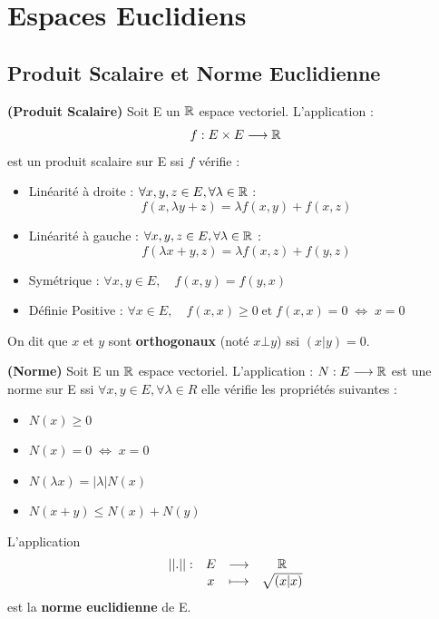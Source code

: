 \chapter{Espaces Euclidiens}

\setlength{\parindent}{0pt}

\section*{Produit Scalaire et Norme Euclidienne}

\begin{definition}
    \textbf{(Produit Scalaire)}
    Soit E un $\mathbb{R}$ espace vectoriel. L'application : \[ f : E \times E \longrightarrow \mathbb{R}  \] est un {produit scalaire} sur E ssi $f$ vérifie :
    \begin{itemize}
        \item {Linéarité à droite : } $\forall x, y, z \in E, \forall \lambda \in \mathbb{R} $ : \[ f(x, \lambda y + z) = \lambda f(x, y) + f(x, z) \] 
        \item {Linéarité à gauche : } $\forall x, y, z \in E, \forall \lambda \in \mathbb{R} $ : \[ f(\lambda x + y, z) = \lambda f(x, z) + f(y, z) \] 
        \item {Symétrique : } $ \forall x, y \in E, \quad f(x, y) = f(y, x) $
        \item {Définie Positive : } $ \forall x \in E, \quad f(x, x) \geq 0 \; \text{et} \; f(x, x) = 0 \; \Longleftrightarrow \; x = 0 $
    \end{itemize}
    On dit que $x$ et $y$ sont \textbf{orthogonaux} (noté $ x \bot y $) ssi $(x|y) = 0$.
\end{definition}

\begin{definition}
    \textbf{(Norme)}
    Soit E un $\mathbb{R}$ espace vectoriel. L'application : $ N : E \longrightarrow \mathbb{R}  $ est une {norme} sur E ssi $\forall x, y \in E, \forall \lambda \in R $ elle vérifie les propriétés suivantes :
    \begin{itemize}
        \item $N(x) \geq 0 $
        \item $ N(x) = 0 \; \Longleftrightarrow \; x = 0 $
        \item $ N(\lambda x) = |\lambda | N(x) $
        \item $ N(x + y) \leq N(x) + N(y) $
    \end{itemize}
    L'application 
    \[ 
        \begin{array}{cccc}
            ||.|| : & E & \longrightarrow & \mathbb{R} \\
             & x & \longmapsto & \sqrt{(x|x)}            
        \end{array}
    \]
    est la \textbf{norme euclidienne} de E.
\end{definition}

